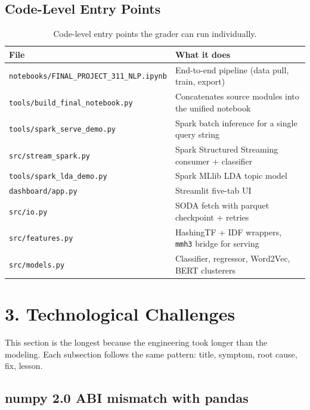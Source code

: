 \documentclass[11pt,letterpaper]{article}
\begin{document}
\subsection{Code-Level Entry Points}

\begin{table}[h]
\centering
\small
\begin{tabular}{ll}
\toprule
\textbf{File} & \textbf{What it does} \\
\midrule
\texttt{notebooks/FINAL\_PROJECT\_311\_NLP.ipynb} & End-to-end pipeline (data pull, train, export) \\
\texttt{tools/build\_final\_notebook.py} & Concatenates source modules into the unified notebook \\
\texttt{tools/spark\_serve\_demo.py} & Spark batch inference for a single query string \\
\texttt{src/stream\_spark.py} & Spark Structured Streaming consumer + classifier \\
\texttt{tools/spark\_lda\_demo.py} & Spark MLlib LDA topic model \\
\texttt{dashboard/app.py} & Streamlit five-tab UI \\
\texttt{src/io.py} & SODA fetch with parquet checkpoint + retries \\
\texttt{src/features.py} & HashingTF + IDF wrappers, \texttt{mmh3} bridge for serving \\
\texttt{src/models.py} & Classifier, regressor, Word2Vec, BERT clusterers \\
\bottomrule
\end{tabular}
\caption{Code-level entry points the grader can run individually.}
\end{table}

\newpage
\section{3. Technological Challenges}

This section is the longest because the engineering took longer than the modeling. Each subsection follows the same pattern: title, symptom, root cause, fix, lesson.

\subsection{numpy 2.0 ABI mismatch with pandas}
\end{document}

